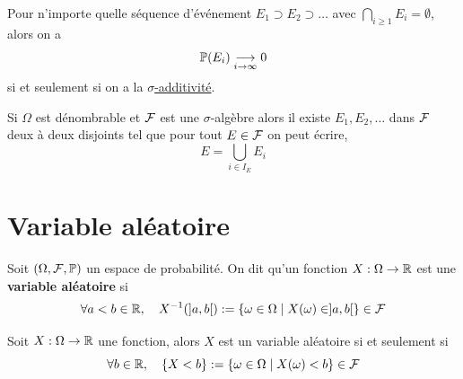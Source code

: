 \begin{proposition}
	Pour n'importe quelle séquence d'événement $E_1 \supset E_2 \supset \ldots$ avec $\bigcap_{i \geqslant 1} E_i = \emptyset$, alors on a 
	\[
	\P (E_i) \underset{i \to \infty}{\longrightarrow}  0 
	\]
	si et seulement si on a la \hyperref[eq: sigma additivité]{$\sigma$-additivité}.
\end{proposition}


\begin{proposition}
	Si $\Omega$ est dénombrable %
	et $\F$ est une $\sigma$-algèbre alors il existe $E_1, E_2, \ldots$ dans $\F$ deux à deux disjoints tel que pour tout $E \in \F$	on peut écrire,
	\[
	E = \bigcup_{i \in I_E} E_i
	\]
\end{proposition}


\section{Variable aléatoire}
\begin{definition} \label{def: Variable aléatoire}
	Soit $(\Omega, \F, \P)$ un espace de probabilité. On dit qu'un fonction $X : \Omega \to \R$ est une \textbf{variable aléatoire} si
	\[
	\forall a < b \in \R, \quad X^{-1}(]a,b[) := \{ \omega \in \Omega \mid X(\omega) \in ]a,b[\} \in \F
	\]
\end{definition}

\begin{theoreme}
	Soit $X : \Omega \to \R$ une fonction, alors $X$ est un variable aléatoire si et seulement si
	\[
	\forall b \in \R, \quad \{ X < b \} := \{ \omega \in \Omega \mid X(\omega) < b\} \in \F
	\]
\end{theoreme}

